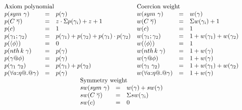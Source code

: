\documentclass[a4paper,UKenglish]{lipics}
\makeatletter
\newcommand{\ol}[1]{\overline{#1}}
\newcommand{\sym}[1]{\mathop{sym}\, #1}
\newcommand{\nth}[2]{\mathop{nth} #1\;#2}
\newcommand{\inst}[2]{#1@#2}
\newcommand{\refl}[1]{\langle#1\rangle}  %
\newcommand{\gammas}{\ol{\gamma}}
\makeatother
\begin{document}
\begin{figure*}\small
\[\begin{array}{c} 
 \begin{array}{lcl} 
      \multicolumn{3}{l}{\text{Axiom polynomial}} \\ 
      p(\sym{\gamma})    & = & p(\gamma) \\ 
      p(C\;\gammas) & = & z \cdot \Sigma p(\gamma_i) + z + 1 \\ 
      p(c)          & = & 1 \\ 
      p(\gamma_1;\gamma_2)     & = & p(\gamma_1) + p(\gamma_2) + p(\gamma_1)\cdot p(\gamma_2) \\ 
      p(\refl{\phi})   & = & 0 \\ 
      p(\nth{k}{\gamma}) & = & p(\gamma) \\ 
      p(\inst{\gamma}{\phi}) & = & p(\gamma) \\ 
      p(\gamma_1\;\gamma_2)    & = & p(\gamma_1) + p(\gamma_2) \\
      p(\forall a{:}\eta @.@ \gamma) & = & p(\gamma)
  \end{array}
  \begin{array}{lcl} 
      \multicolumn{3}{l}{\text{Coercion weight}} \\ 
      w(\sym{\gamma})      & = & w(\gamma) \\ 
      w(C\;\gammas)   & = & \Sigma w(\gamma_i) + 1 \\ 
      w(c)            & = & 1 \\ 
      w(\gamma_1;\gamma_2)       & = & 1 + w(\gamma_1) + w(\gamma_2) \\ 
      w(\refl{\phi})     & = & 1 \\ 
      w(\nth{k}{\gamma})   & = & 1 + w(\gamma) \\ 
      w(\inst{\gamma}{\phi})  & = & 1 + w(\gamma) \\ 
      w(\gamma_1\;\gamma_2)      & = & 1 + w(\gamma_1) + w(\gamma_2) \\ 
      w(\forall a{:}\eta @.@ \gamma) & = & 1 + w(\gamma)
  \end{array} \\ 
\begin{array}{lcl} 
      \multicolumn{3}{l}{\text{Symmetry weight}} \\ 
      sw(\sym{\gamma})      & = & w(\gamma) + sw(\gamma) \\
      sw(C\;\gammas)   & = & \Sigma sw(\gamma_i) \\ 
      sw(c)            & = & 0 \\ 

\end{array}
\end{array}\]
\end{figure*}
\end{document}
